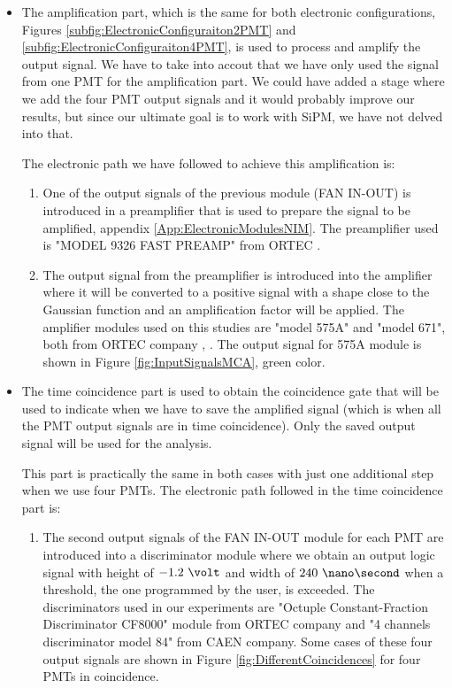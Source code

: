 \begin{itemize}

\item{} The amplification part, which is the same for both electronic configurations, Figures \ref{subfig:ElectronicConfiguraiton2PMT} and \ref{subfig:ElectronicConfiguraiton4PMT}, is used to process and amplify the output signal. We have to take into accout that we have only used the signal from one PMT for the amplification part. We could have added a stage where we add the four PMT output signals and it would probably improve our results, but since our ultimate goal is to work with SiPM, we have not delved into that.

The electronic path we have followed to achieve this amplification is:

\begin{enumerate}

\item{} One of the output signals of the previous module (FAN IN-OUT) is introduced in a preamplifier that is used to prepare the signal to be amplified, appendix \ref{App:ElectronicModulesNIM}. The preamplifier used is "MODEL 9326 FAST PREAMP" from ORTEC \cite{DataSheetPreAmp}.

\item{} The output signal from the preamplifier is introduced into the amplifier where it will be converted to a positive signal with a shape close to the Gaussian function and an amplification factor will be applied. The amplifier modules used on this studies are "model 575A" and "model 671", both from ORTEC company \cite{DataSheet575Amp}, \cite{DataSheet671Amp}. The output signal for 575A module is shown in Figure \ref{fig:InputSignalsMCA}, green color.

\end{enumerate}

\item{} The time coincidence part is used to obtain the coincidence gate that will be used to indicate when we have to save the amplified signal (which is when all the PMT output signals are in time coincidence). Only the saved output signal will be used for the analysis. 

This part is practically the same in both cases with just one additional step when we use four PMTs. The electronic path followed in the time coincidence part is:

\begin{enumerate}

\item{} The second output signals of the FAN IN-OUT module for each PMT are introduced into a discriminator module where we obtain an output logic signal with height of $-1.2~\volt$ and width of $240~\nano\second$ when a threshold, the one programmed by the user, is exceeded. The discriminators used in our experiments are  "Octuple Constant-Fraction Discriminator CF8000" module from ORTEC company \cite{DataSheetDiscriminator} and "4 channels discriminator model 84" from CAEN company. Some cases of these four output signals are shown in Figure \ref{fig:DifferentCoincidences} for four PMTs in coincidence.


\end{enumerate}
\end{itemize}
